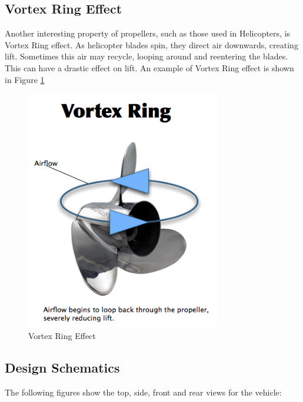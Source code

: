 \subsection{Vortex Ring Effect}
Another interesting property of propellers, such as those used in Helicopters, is Vortex Ring effect. As helicopter blades spin, they direct air downwards, creating lift. Sometimes this air may recycle, looping around and reentering the blades. This can have a drastic effect on lift.  An example of Vortex Ring effect is shown in Figure \ref{vortexRing}

\begin{figure}[h]
  \begin{center}
    \includegraphics[width=85mm]{imageSources/vortexRing.png}
  \end{center}
  \caption{Vortex Ring Effect} 
  \label{vortexRing}
\end{figure}

\subsection{Design Schematics}

The following figures show the top, side, front and rear views for the vehicle:

